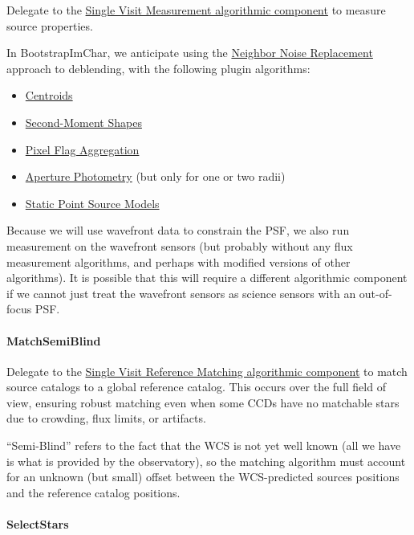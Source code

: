 Delegate to the \hyperref[sec:acSingleVisitMeasurement]{Single Visit Measurement algorithmic component} to measure source properties.

In BootstrapImChar, we anticipate using the \hyperref[sec:acReplaceNeighborsWithNoise]{Neighbor Noise Replacement} approach to deblending, with the following plugin algorithms:
\begin{itemize}
\item \hyperref[sec:acCentroidAlgorithms]{Centroids}
\item \hyperref[sec:acShapeAlgorithms]{Second-Moment Shapes}
\item \hyperref[sec:acPixelFlags]{Pixel Flag Aggregation}
\item \hyperref[sec:acAperturePhotometry]{Aperture Photometry} (but only for one or two radii)
\item \hyperref[sec:acStaticPointSourceModels]{Static Point Source Models}
\end{itemize}

Because we will use wavefront data to constrain the PSF, we also run measurement on the wavefront sensors (but probably without any flux measurement algorithms, and perhaps with modified versions of other algorithms).  It is possible that this will require a different algorithmic component if we cannot just treat the wavefront sensors as science sensors with an out-of-focus PSF.

\paragraph{MatchSemiBlind}
\label{sec:drpBootstrapImChar_MatchSemiBlind}

Delegate to the \hyperref[sec:acSingleVisitReferenceMatching]{Single Visit Reference Matching algorithmic component} to match source catalogs to a global reference catalog.  This occurs over the full field of view, ensuring robust matching even when some CCDs have no matchable stars due to crowding, flux limits, or artifacts.

``Semi-Blind'' refers to the fact that the WCS is not yet well known (all we have is what is provided by the observatory), so the matching algorithm must account for an unknown (but small) offset between the WCS-predicted sources positions and the reference catalog positions.

\paragraph{SelectStars}
\label{sec:drpBootstrapImChar_SelectStars}

